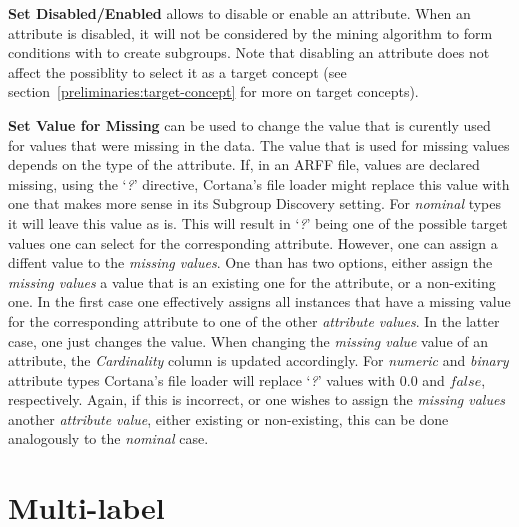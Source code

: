 \documentclass{article}
\begin{document}
\textbf{Set Disabled/Enabled} allows to disable or enable an attribute.
When an attribute is disabled, it will not be considered by the mining algorithm to form conditions with to create subgroups.
Note that disabling an attribute does not affect the possiblity to select it as a target concept (see section~\ref{preliminaries:target-concept} for more on target concepts).

\textbf{Set Value for Missing} can be used to change the value that is curently used for values that were missing in the data.
The value that is used for missing values depends on the type of the attribute.
If, in an ARFF file, values are declared missing, using the `\emph{?}' directive, Cortana's file loader might replace this value with one that makes more sense in its Subgroup Discovery setting.
For \emph{nominal} types it will leave this value as is.
This will result in `\emph{?}' being one of the possible target values one can select for the corresponding attribute.
However, one can assign a diffent value to the \emph{missing values}.
One than has two options, either assign the \emph{missing values} a value that is an existing one for the attribute, or a non-exiting one.
In the first case one effectively assigns all instances that have a missing value for the corresponding attribute to one of the other \emph{attribute values}.
In the latter case, one just changes the value.
When changing the \emph{missing value} value of an attribute, the \emph{Cardinality} column is updated accordingly.
For \emph{numeric} and \emph{binary} attribute types Cortana's file loader will replace `\emph{?}' values with $0.0$ and $false$, respectively.
Again, if this is incorrect, or one wishes to assign the \emph{missing values} another \emph{attribute value}, either existing or non-existing, this can be done analogously to the \emph{nominal} case.





\section{Multi-label}
\label{section:multi-label}
\end{document}
